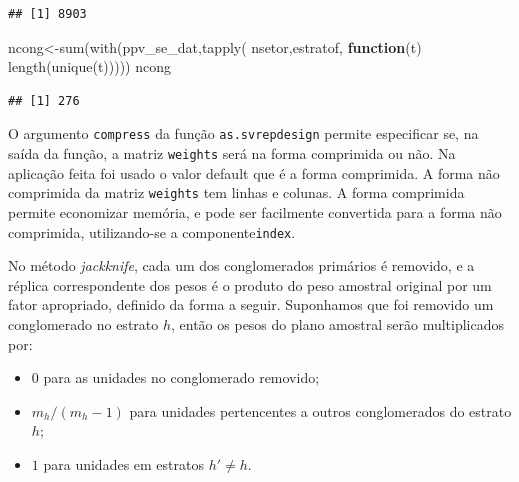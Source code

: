 \documentclass[
  12pt,
  brazilian,
]{book}
\newenvironment{Shaded}{\begin{snugshade}}{\end{snugshade}}
\newcommand{\ControlFlowTok}[1]{\textcolor[rgb]{0.13,0.29,0.53}{\textbf{#1}}}
\newcommand{\FunctionTok}[1]{\textcolor[rgb]{0.00,0.00,0.00}{#1}}
\newcommand{\NormalTok}[1]{#1}
\newcommand{\OtherTok}[1]{\textcolor[rgb]{0.56,0.35,0.01}{#1}}
\newcommand{\SpecialCharTok}[1]{\textcolor[rgb]{0.00,0.00,0.00}{#1}}
\providecommand{\tightlist}{%
  \setlength{\itemsep}{0pt}\setlength{\parskip}{0pt}}
\theoremstyle{definition}
\theoremstyle{definition}
\theoremstyle{definition}
\theoremstyle{definition}
\theoremstyle{remark}
\begin{document}
\begin{Shaded}
\end{Shaded}

\begin{verbatim}
## [1] 8903
\end{verbatim}

\begin{Shaded}
\begin{Highlighting}[]
\NormalTok{ncong}\OtherTok{\textless{}{-}}\FunctionTok{sum}\NormalTok{(}\FunctionTok{with}\NormalTok{(ppv\_se\_dat,}\FunctionTok{tapply}\NormalTok{( nsetor,estratof, }\ControlFlowTok{function}\NormalTok{(t) }\FunctionTok{length}\NormalTok{(}\FunctionTok{unique}\NormalTok{(t)))))}
\NormalTok{ncong}
\end{Highlighting}
\end{Shaded}

\begin{verbatim}
## [1] 276
\end{verbatim}

O argumento \texttt{compress} da função \texttt{as.svrepdesign} permite especificar se, na saída da função, a matriz
\texttt{weights} será na forma comprimida ou não. Na aplicação feita foi usado o valor default que é a forma comprimida.
A forma não comprimida da matriz \texttt{weights} tem  linhas e  colunas. A forma comprimida
permite economizar memória, e pode ser facilmente convertida para a forma não comprimida, utilizando-se a componente\texttt{index}.

No método \emph{jackknife}, cada um dos conglomerados primários é removido, e a réplica correspondente dos pesos é o produto
do peso amostral original por um fator apropriado, definido da forma a seguir. Suponhamos que foi removido um conglomerado
no estrato \(h\), então os pesos do plano amostral serão multiplicados por:

\begin{itemize}
\tightlist
\item
  \(0\) para as unidades no conglomerado removido;
\item
  \(m_h/(m_h-1)\) para unidades pertencentes a outros conglomerados do estrato \(h\);
\item
  \(1\) para unidades em estratos \(h'\neq h\).
\end{itemize}
\end{document}
